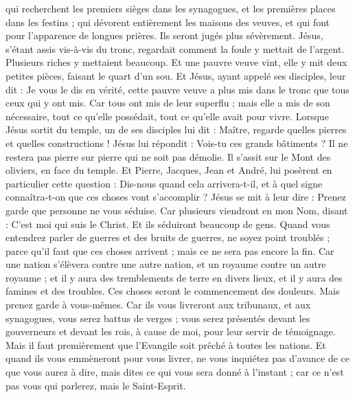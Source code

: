 \begin{multicols}{2}
qui recherchent les premiers sièges dans les synagogues, et les premières places dans les festins ;
qui dévorent entièrement les maisons des veuves, et qui font pour l’apparence de longues prières. Ils seront jugés plus sévèrement.
Jésus, s’étant assis vis-à-vis du tronc, regardait comment la foule y mettait de l'argent. Plusieurs riches y mettaient beaucoup.
Et une pauvre veuve vint, elle y mit deux petites pièces, faisant le quart d’un sou.
Et Jésus, ayant appelé ses disciples, leur dit : Je vous le dis en vérité, cette pauvre veuve a plus mis dans le tronc que tous ceux qui y ont mis.
Car tous ont mis de leur superflu ; mais elle a mis de son nécessaire, tout ce qu'elle possédait, tout ce qu’elle avait pour vivre.
\VerseOne{}Lorsque Jésus sortit du temple, un de ses disciples lui dit : Maître, regarde quelles pierres et quelles constructions !
Jésus lui répondit : Vois-tu ces grands bâtiments ? Il ne restera pas pierre sur pierre qui ne soit pas démolie.
Il s’assit sur le Mont des oliviers, en face du temple. Et Pierre, Jacques, Jean et André, lui posèrent en particulier cette question :
Dis-nous quand cela arrivera-t-il, et à quel signe connaîtra-t-on que ces choses vont s'accomplir ?
Jésus se mit à leur dire : Prenez garde que personne ne vous séduise.
Car plusieurs viendront en mon Nom, disant : C'est moi qui suis le Christ. Et ils séduiront beaucoup de gens.
Quand vous entendrez parler de guerres et des bruits de guerres, ne soyez point troublés ; parce qu'il faut que ces choses arrivent ; mais ce ne sera pas encore la fin.
Car une nation s'élèvera contre une autre nation, et un royaume contre un autre royaume ; et il y aura des tremblements de terre en divers lieux, et il y aura des famines et des troubles. Ces choses seront le commencement des douleurs.
Mais prenez garde à vous-mêmes. Car ils vous livreront aux tribunaux, et aux synagogues, vous serez battus de verges ; vous serez présentés devant les gouverneurs et devant les rois, à cause de moi, pour leur servir de témoignage.
Mais il faut premièrement que l'Evangile soit prêché à toutes les nations.
Et quand ils vous emmèneront pour vous livrer, ne vous inquiétez pas d’avance de ce que vous aurez à dire, mais dites ce qui vous sera donné à l’instant ; car ce n’est pas vous qui parlerez, mais le Saint-Esprit.

\end{multicols}
